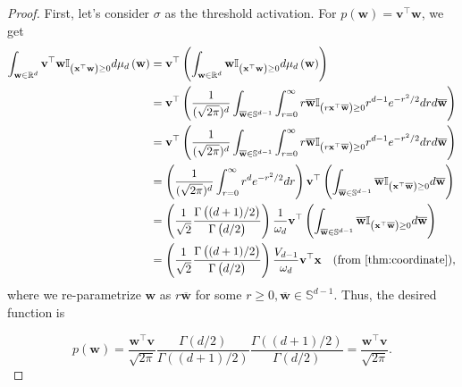 \begin{proof}
	\iffalse
	First, let's consider $\sigma$ as the threshold activation.
	For $p(\mathbf{w}) = \mathbf{v}^{\top} \mathbf{w}$, we get
	\begin{align*}
		\int_{\mathbf{w} \in \mathbb{R}^{d}}  \mathbf{v}^{\top} \mathbf{w} \mathbb{I}_{\left(\mathbf{x}^{\top} \mathbf{w} \right) \ge 0} d\mu_d \left(\mathbf{w}\right) 
		&=  \mathbf{v}^{\top} \left(\int_{\mathbf{w} \in \mathbb{R}^{d}} \mathbf{w} \mathbb{I}_{\left(\mathbf{x}^{\top} \mathbf{w} \right) \ge 0} d\mu_d \left(\mathbf{w}\right) \right)
		\\& = \mathbf{v}^{\top} \left( \frac{1}{(\sqrt{2\pi})^{d}} \int_{\overline{\mathbf{w}} \in \mathbb{S}^{d-1}} \int_{r=0}^{\infty}  r \overline{\mathbf{w}} \mathbb{I}_{\left(r \mathbf{x}^{\top} \overline{\mathbf{w}} \right) \ge 0} r^{d-1}e^{-r^2/2} dr d\overline{\mathbf{w}} \right)
		\\& = \mathbf{v}^{\top} \left( \frac{1}{(\sqrt{2\pi})^{d}} \int_{\overline{\mathbf{w}} \in \mathbb{S}^{d-1}} \int_{r=0}^{\infty}  r \overline{\mathbf{w}} \mathbb{I}_{\left(r \mathbf{x}^{\top} \overline{\mathbf{w}} \right) \ge 0} r^{d-1}e^{-r^2/2} dr d\overline{\mathbf{w}} \right)
		\\& = \left(\frac{1}{(\sqrt{2\pi})^{d}} \int_{r=0}^{\infty} r^d e^{-r^2/2} dr \right)  \mathbf{v}^{\top} \left(   \int_{\overline{\mathbf{w}} \in \mathbb{S}^{d-1}} \overline{\mathbf{w}} \mathbb{I}_{\left(\mathbf{x}^{\top} \overline{\mathbf{w}} \right) \ge 0}  d\overline{\mathbf{w}} \right)
		\\&=  \left(\frac{1}{\sqrt{2}} \frac{\Gamma\left((d+1)/2\right)}{\Gamma\left(d/2\right)} \right) \frac{1}{\omega_d} \mathbf{v}^{\top} \left(   \int_{\overline{\mathbf{w}} \in \mathbb{S}^{d-1}} \overline{\mathbf{w}} \mathbb{I}_{\left(\mathbf{x}^{\top} \overline{\mathbf{w}} \right) \ge 0}  d\overline{\mathbf{w}} \right)
		\\& =  \left(\frac{1}{\sqrt{2}} \frac{\Gamma\left((d+1)/2\right)}{\Gamma\left(d/2\right)} \right) \frac{V_{d-1}}{\omega_d} \mathbf{v}^{\top} \mathbf{x}  \quad \text{(from \autoref{thm:coordinate})},  
	\end{align*}
	where we re-parametrize $\mathbf{w}$ as $r \overline{\mathbf{w}}$ for some $r \ge 0, \overline{\mathbf{w}} \in \mathbb{S}^{d-1}$. Thus, the desired function is
	
	\begin{equation*}
		p\left(\mathbf{w}\right) =  \frac{\mathbf{w}^{\top} \mathbf{v}}{\sqrt{2\pi}} \frac{ \Gamma\left(d/2\right)}{\Gamma\left((d+1)/2\right)}\frac{\Gamma\left((d+1)/2\right)}{ \Gamma\left(d/2\right)} = \frac{\mathbf{w}^{\top} \mathbf{v}}{\sqrt{2\pi}}. 
	\end{equation*}
	

\end{proof}
